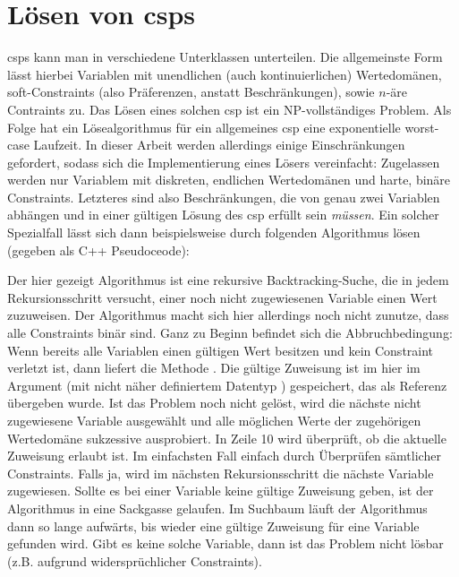 \section{Lösen von \acp{csp}}
\label{sec:Solving}
\acp{csp} kann man in verschiedene Unterklassen unterteilen. Die allgemeinste Form lässt hierbei Variablen mit unendlichen (auch kontinuierlichen) Wertedomänen, soft-Constraints
(also Präferenzen, anstatt Beschränkungen), sowie $n$-äre Contraints zu. Das Lösen eines solchen \ac*{csp} ist ein NP-vollständiges Problem. Als Folge hat ein Lösealgorithmus für
ein allgemeines \ac*{csp} eine exponentielle worst-case Laufzeit. In dieser Arbeit werden allerdings einige Einschränkungen gefordert, sodass sich die Implementierung eines Lösers
vereinfacht: Zugelassen werden nur Variablem mit diskreten, endlichen Wertedomänen und harte, binäre Constraints. Letzteres sind also Beschränkungen, die von genau zwei Variablen
abhängen und in einer gültigen Lösung des \ac*{csp} erfüllt sein \textit{müssen}. Ein solcher Spezialfall lässt sich dann beispielsweise durch folgenden Algorithmus lösen (gegeben
als C++ Pseudoceode):

Der hier gezeigt Algorithmus ist eine rekursive Backtracking-Suche, die in jedem Rekursionsschritt versucht, einer noch nicht zugewiesenen Variable einen Wert zuzuweisen. Der
Algorithmus macht sich hier allerdings noch nicht zunutze, dass alle Constraints binär sind. Ganz zu Beginn befindet sich die Abbruchbedingung: Wenn bereits alle Variablen einen
gültigen Wert besitzen und kein Constraint verletzt ist, dann liefert die Methode  . Die gültige Zuweisung ist im hier im Argument 
(mit nicht näher definiertem Datentyp ) gespeichert, das als Referenz übergeben wurde. Ist das Problem noch nicht gelöst, wird die nächste nicht zugewiesene Variable
ausgewählt und alle möglichen Werte der zugehörigen Wertedomäne sukzessive ausprobiert. In Zeile 10 wird überprüft, ob die aktuelle Zuweisung erlaubt ist. Im einfachsten Fall
einfach durch Überprüfen sämtlicher Constraints. Falls ja, wird im nächsten Rekursionsschritt die nächste Variable zugewiesen. Sollte es bei einer Variable keine gültige Zuweisung
geben, ist der Algorithmus in eine Sackgasse gelaufen. Im Suchbaum läuft der Algorithmus dann so lange aufwärts, bis wieder eine gültige Zuweisung für eine Variable gefunden wird.
Gibt es keine solche Variable, dann ist das Problem nicht lösbar (z.B. aufgrund  widersprüchlicher Constraints). 

